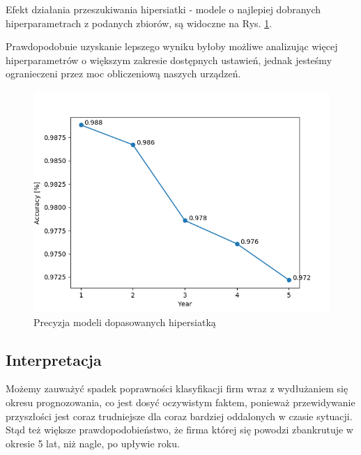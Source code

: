 \documentclass[11pt]{article}
\begin{document}
Efekt działania przeszukiwania hipersiatki - modele o najlepiej dobranych hiperparametrach z podanych zbiorów, są widoczne na Rys. \ref{best_rf}.

Prawdopodobnie uzyskanie lepszego wyniku byłoby możliwe analizując więcej hiperparametrów o większym zakresie dostępnych ustawień, jednak jesteśmy ogranieczeni przez moc obliczeniową naszych urządzeń.

\begin{figure}[H]
\caption{Precyzja modeli dopasowanych hipersiatką}
\label{best_rf}
\centering
\includegraphics[scale=0.8]{best_rf}
\end{figure}
\subsection{Interpretacja}
Możemy zauważyć spadek poprawności klasyfikacji firm wraz z wydłużaniem się okresu prognozowania, co jest dosyć oczywistym faktem, ponieważ przewidywanie przyszłości jest coraz trudniejsze dla coraz bardziej oddalonych w czasie sytuacji. Stąd też większe prawdopodobieństwo, że firma której się powodzi zbankrutuje w okresie 5 lat, niż nagle, po upływie roku.
\end{document}
